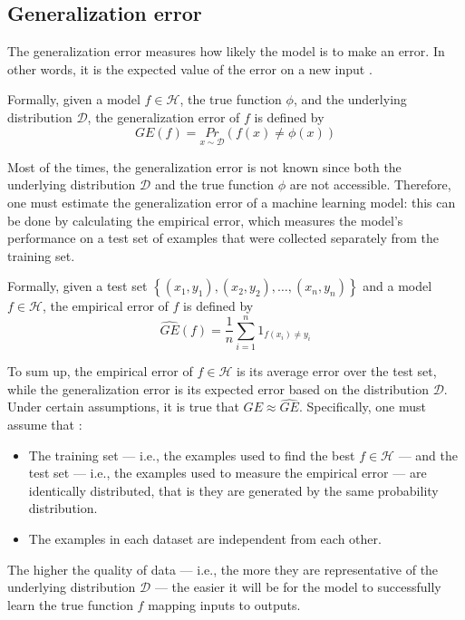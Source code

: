         \subsection{Generalization error}
            The generalization error measures how likely the model is to make an error. In other words, it is the expected value of the error on a new input \cite[12]{Mohri}.
            
            Formally, given a model \(f \in \mathcal{H}\), the true function \(\phi\), and the underlying distribution \(\mathcal{D}\), the generalization error of \(f\) is defined by
            \[GE\left(f\right) = \underset{x \sim \mathcal{D}}{Pr}\left(f\left(x\right) \ne \phi\left(x\right)\right)\]
            
            Most of the times, the generalization error is not known since both the underlying distribution \(\mathcal{D}\) and the true function \(\phi\) are not accessible. Therefore, one must estimate the generalization error of a machine learning model: this can be done by calculating the empirical error, which measures the model's performance on a test set of examples that were collected separately from the training set.
            
            Formally, given a test set \(\left\{\left(x_{1},y_{1}\right), \left(x_{2},y_{2}\right), \dots, \left(x_{n},y_{n}\right)\right\}\) and a model \(f \in \mathcal{H}\), the empirical error of \(f\) is defined by
            \[\widehat{GE}\left(f\right) = \frac{1}{n}\sum_{i=1}^{n}1_{f\left(x_{i}\right) \ne y_{i}}\]
            
            To sum up, the empirical error of \(f\in\mathcal{H}\) is its average error over the test set, while the generalization error is its expected error based on the distribution \(\mathcal{D}\). Under certain assumptions, it is true that \(GE \approx \widehat{GE}\). Specifically, one must assume that \cite[111]{Goodfellow}:
            \begin{itemize}
                \item The training set --- i.e., the examples used to find the best \(f\in\mathcal{H}\) --- and the test set --- i.e., the examples used to measure the empirical error --- are identically distributed, that is they are generated by the same probability distribution.
                \item The examples in each dataset are independent from each other.
            \end{itemize}
            The higher the quality of data --- i.e., the more they are representative of the underlying distribution \(\mathcal{D}\) --- the easier it will be for the model to successfully learn the true function \(f\) mapping inputs to outputs.
